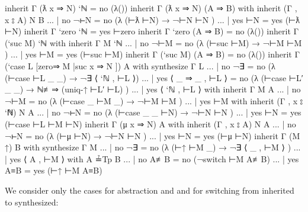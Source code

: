 \begin{fence}
\begin{code}
inherit Γ (ƛ x ⇒ N) `ℕ      =  no  (λ())
inherit Γ (ƛ x ⇒ N) (A ⇒ B) with inherit (Γ , x ⦂ A) N B
... | no ¬⊢N                =  no  (λ{ (⊢ƛ ⊢N)  →  ¬⊢N ⊢N })
... | yes ⊢N                =  yes (⊢ƛ ⊢N)
inherit Γ `zero `ℕ          =  yes ⊢zero
inherit Γ `zero (A ⇒ B)     =  no  (λ())
inherit Γ (`suc M) `ℕ with inherit Γ M `ℕ
... | no ¬⊢M                =  no  (λ{ (⊢suc ⊢M)  →  ¬⊢M ⊢M })
... | yes ⊢M                =  yes (⊢suc ⊢M)
inherit Γ (`suc M) (A ⇒ B)  =  no  (λ())
inherit Γ (`case L [zero⇒ M |suc x ⇒ N ]) A with synthesize Γ L
... | no ¬∃                 =  no  (λ{ (⊢case ⊢L  _ _) → ¬∃ ⟨ `ℕ , ⊢L ⟩})
... | yes ⟨ _ ⇒ _ , ⊢L ⟩    =  no  (λ{ (⊢case ⊢L′ _ _) → ℕ≢⇒ (uniq-↑ ⊢L′ ⊢L) })
... | yes ⟨ `ℕ ,    ⊢L ⟩ with inherit Γ M A
...    | no ¬⊢M             =  no  (λ{ (⊢case _ ⊢M _) → ¬⊢M ⊢M })
...    | yes ⊢M with inherit (Γ , x ⦂ `ℕ) N A
...       | no ¬⊢N          =  no  (λ{ (⊢case _ _ ⊢N) → ¬⊢N ⊢N })
...       | yes ⊢N          =  yes (⊢case ⊢L ⊢M ⊢N)
inherit Γ (μ x ⇒ N) A with inherit (Γ , x ⦂ A) N A
... | no ¬⊢N                =  no  (λ{ (⊢μ ⊢N) → ¬⊢N ⊢N })
... | yes ⊢N                =  yes (⊢μ ⊢N)
inherit Γ (M ↑) B with synthesize Γ M
... | no  ¬∃                =  no  (λ{ (⊢↑ ⊢M _) → ¬∃ ⟨ _ , ⊢M ⟩ })
... | yes ⟨ A , ⊢M ⟩ with A ≟Tp B
...   | no  A≢B             =  no  (¬switch ⊢M A≢B)
...   | yes A≡B             =  yes (⊢↑ ⊢M A≡B)
\end{code}
\end{fence}

We consider only the cases for abstraction and and for switching from
inherited to synthesized:

